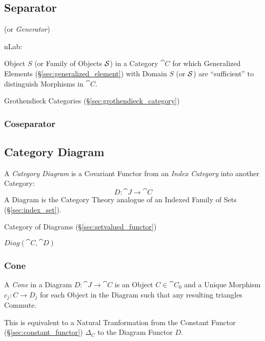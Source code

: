 \subsection{Separator}\label{sec:separator}

(or \emph{Generator})

nLab:

Object $S$ (or Family of Objects $\mathcal{S}$) in a Category $\cat{C}$
for which Generalized Elements (\S\ref{sec:generalized_element}) with
Domain $S$ (or $\mathcal{S}$) are ``sufficient'' to distinguish
Morphisms in $\cat{C}$.

Grothendieck Categories (\S\ref{sec:grothendieck_category})



\subsubsection{Coseparator}\label{sec:coseparator}



\subsection{Category Diagram}\label{sec:category_diagram}

A \emph{Category Diagram} is a Covariant Functor from an \emph{Index
  Category} into another Category:
\[
  D : \cat{J} \rightarrow \cat{C}
\]
A Diagram is the Category Theory analogue of an Indexed Family of Sets
(\S\ref{sec:index_set}).

Category of Diagrams (\S\ref{sec:setvalued_functor})

$Diag(\cat{C},\cat{D})$



\subsubsection{Cone}\label{sec:category_cone}

A \emph{Cone} in a Diagram $D : \cat{J} \rightarrow \cat{C}$ is
an Object $C \in \cat{C}_0$ and a Unique Morphism $c_j : C
\rightarrow D_j$ for each Object in the Diagram such that any
resulting triangles Commute.

This is equivalent to a Natural Tranformation from the Constant
Functor (\S\ref{sec:constant_functor}) $\Delta_C$ to the Diagram
Functor $D$.


